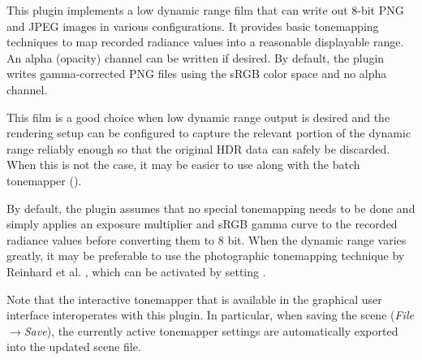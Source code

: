 {{    }
}
This plugin implements a low dynamic range film that can write out 8-bit PNG
and JPEG images in various configurations. It provides basic tonemapping techniques
to map recorded radiance values into a reasonable displayable range. An alpha (opacity)
channel can be written if desired. By default, the plugin writes gamma-corrected
PNG files using the sRGB color space and no alpha channel.

This film is a good choice when low dynamic range output is desired
and the rendering setup can be configured to capture the relevant portion
of the dynamic range reliably enough so that the original HDR data can safely
be discarded. When this is not the case, it may be easier to use 
along with the batch tonemapper ().

By default, the plugin assumes that no special tonemapping needs to be done and simply
applies an exposure multiplier and sRGB gamma curve to the recorded radiance values
before converting them to 8 bit. When the dynamic range varies greatly, it may be
preferable to use the photographic tonemapping technique by Reinhard et al.
\cite{Reinhard2002Photographic}, which can be activated by setting .

Note that the interactive tonemapper that is available in the graphical user interface 
interoperates with this plugin. In particular, when saving the scene
(\emph{File}$\to$\emph{Save}), the currently active tonemapper
settings are automatically exported into the updated scene file.

